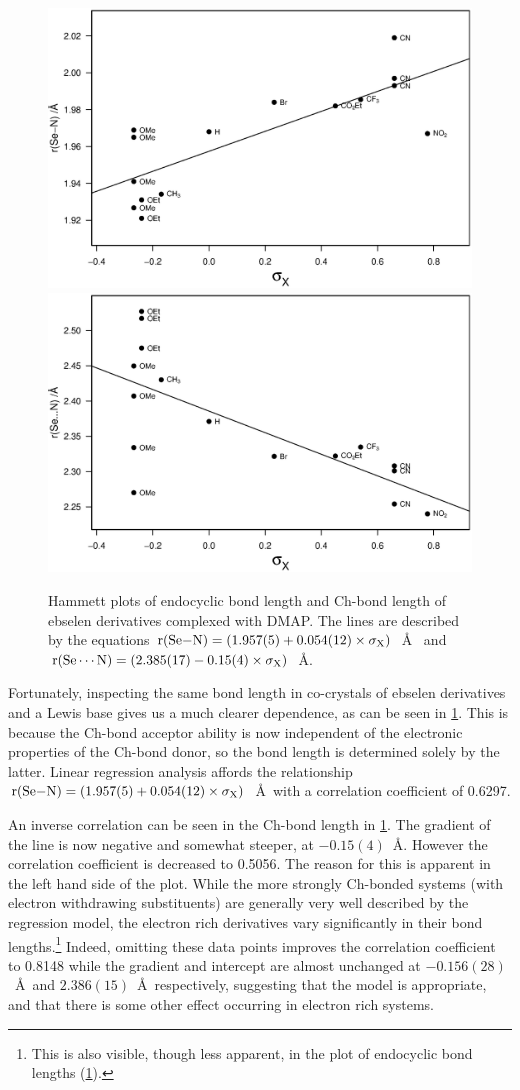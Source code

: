 \begin{refsection}
\begin{figure}
    \centering
    \includegraphics[width=0.48\linewidth]{Figures/hammett-endo-dmap.eps}
    \includegraphics[width=0.48\linewidth]{Figures/hammett-dmap.eps}
    \caption{Hammett plots of endocyclic  bond length and  Ch-bond length of ebselen derivatives complexed with DMAP. The lines are described by the equations $\mathrm{r}(\ce{Se-N}) = (1.957(5) + 0.054(12) \times \sigma_{\mathrm{X}})$~\AA~ and $\mathrm{r}(\ce{Se\cdots N}) = (2.385(17) - 0.15(4) \times \sigma_{\mathrm{X}})$~\AA.}
    \label{fig:hammett-dmap}
\end{figure}

Fortunately, inspecting the same bond length in co-crystals of ebselen derivatives and a Lewis base gives us a much clearer dependence, as can be seen in \ref{fig:hammett-dmap}. 
This is because the Ch-bond acceptor ability is now independent of the electronic properties of the Ch-bond donor, so the  bond length is determined solely by the latter.
Linear regression analysis affords the relationship $\mathrm{r}(\ce{Se-N}) = (1.957(5) + 0.054(12) \times \sigma_{\mathrm{X}})$~\AA~with a correlation coefficient of 0.6297. 

An inverse correlation can be seen in the  Ch-bond length in \ref{fig:hammett-dmap}. 
The gradient of the line is now negative and somewhat steeper, at $-0.15(4)$~\AA.
However the correlation coefficient is decreased to 0.5056.
The reason for this is apparent in the left hand side of the plot.
While the more strongly Ch-bonded systems (with electron withdrawing substituents) are generally very well described by the regression model, the electron rich derivatives  vary significantly in their bond lengths.\footnote{This is also visible, though less apparent, in the plot of endocyclic bond lengths (\ref{fig:hammett-dmap}).}
Indeed, omitting these data points improves the correlation coefficient to 0.8148 while the gradient and intercept are almost unchanged at $-0.156(28)$~\AA~and $2.386(15)$~\AA~respectively, suggesting that the model is appropriate, and that there is some other effect occurring in electron rich systems.


\end{refsection}
